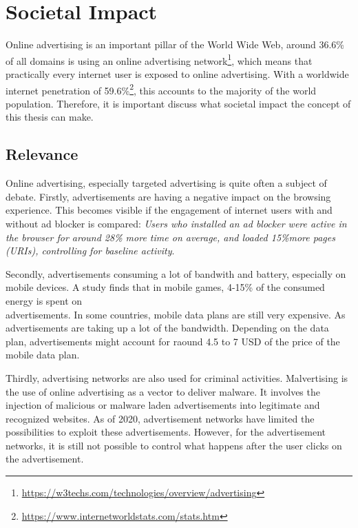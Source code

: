\chapter{Societal Impact}
\label{cha:societalimpact}

Online advertising is an important pillar of the World Wide Web, around 36.6\% of all domains is using an online advertising network\footnote{\url{https://w3techs.com/technologies/overview/advertising}}, which means that practically every internet user is exposed to online advertising. With a worldwide internet penetration of 59.6\%\footnote{\url{https://www.internetworldstats.com/stats.htm}}, this accounts to the majority of the world population. Therefore, it is important discuss what societal impact the concept of this thesis can make.

\section{Relevance}
Online advertising, especially targeted advertising is quite often a subject of debate. Firstly, advertisements are having a negative impact on the browsing experience. This becomes visible if the engagement of internet users with and without ad blocker is compared: \textit{Users who installed an ad blocker were active in the browser for around 28\% more time on average, and loaded 15\%more pages (URIs), controlling for baseline activity}\cite{googlefee}.

Secondly, advertisements consuming a lot of bandwith and battery, especially on mobile devices. A study finds that in mobile games, 4-15\% of the consumed energy is spent on\\ advertisements\cite{prochkova2012energy}. In some countries, mobile data plans are still very expensive. As advertisements are taking up a lot of the bandwidth. Depending on the data plan, advertisements might account for raound 4.5 to 7 USD of the price of the mobile data plan\cite{van2012costs}.

Thirdly, advertising networks are also used for criminal activities. Malvertising is the use of online advertising as a vector to deliver malware. It involves the injection of malicious or malware laden advertisements into legitimate and recognized websites\cite{dwyer2016gone}. As of 2020, advertisement networks have limited the possibilities to exploit these advertisements. However, for the advertisement networks, it is still not possible to control what happens after the user clicks on the advertisement.

